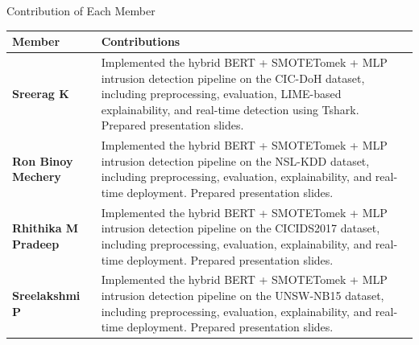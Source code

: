 \documentclass[aspectratio=169,xcolor=dvipsnames]{beamer}
\begin{document}
\begin{frame}{Contribution of Each Member}

\begin{table}[h!]
\centering
\renewcommand{\arraystretch}{1.3}
\small
\begin{tabular}{|p{3cm}|p{9.5cm}|}
\hline
\textbf{Member} & \textbf{Contributions} \\ \hline

\textbf{Sreerag K} &
Implemented the hybrid BERT + SMOTETomek + MLP intrusion detection pipeline on the CIC-DoH dataset, including preprocessing, evaluation, LIME-based explainability, and real-time detection using Tshark. Prepared presentation slides.
\\ \hline

\textbf{Ron Binoy Mechery} &
Implemented the hybrid BERT + SMOTETomek + MLP intrusion detection pipeline on the NSL-KDD dataset, including preprocessing, evaluation, explainability, and real-time deployment. Prepared presentation slides.
\\ \hline

\textbf{Rhithika M Pradeep} &
Implemented the hybrid BERT + SMOTETomek + MLP intrusion detection pipeline on the CICIDS2017 dataset, including preprocessing, evaluation, explainability, and real-time deployment. Prepared presentation slides.
\\ \hline

\textbf{Sreelakshmi P} &
Implemented the hybrid BERT + SMOTETomek + MLP intrusion detection pipeline on the UNSW-NB15 dataset, including preprocessing, evaluation, explainability, and real-time deployment. Prepared presentation slides.
\\ \hline

\end{tabular}
\end{table}

\end{frame}
\end{document}
